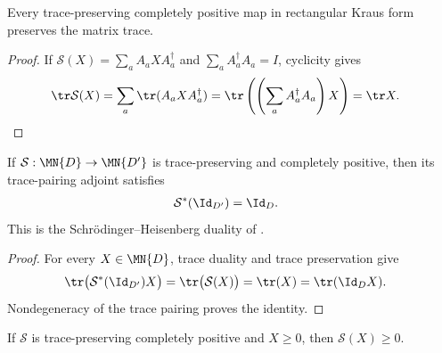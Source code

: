\begin{theorem}
    \label{thm:is_kraus_cptp_trace_map}
    \leanok
    Every trace-preserving completely positive map in rectangular Kraus form
    preserves the matrix trace.
\end{theorem}

\begin{proof}
    \leanok
    If $\mathcal S(X)=\sum_a A_aXA_a^\dagger$ and
    $\sum_a A_a^\dagger A_a=I$, cyclicity gives
    \begin{align}
        \tr\mathcal S(X)
        &=\sum_a\tr(A_aXA_a^\dagger)
          =\tr\left(\left(\sum_a A_a^\dagger A_a\right)X\right)
          =\tr X.
        \notag
    \end{align}
\end{proof}

\begin{theorem}
    \label{thm:is_kraus_cptp_trace_adjoint_one}
    \leanok
    If $\mathcal S:\MN{D}\to\MN{D'}$ is trace-preserving and completely
    positive, then its trace-pairing adjoint satisfies
    \begin{align}
        \mathcal S^*(\Id_{D'})
        &=\Id_D.
        \notag
    \end{align}
    This is the Schrödinger--Heisenberg duality of
    \cite[Section~1.2]{Wolf2012Quantum}.
\end{theorem}

\begin{proof}
    \leanok
    For every $X\in\MN{D}$, trace duality and trace preservation give
    \begin{align}
        \tr\bigl(\mathcal S^*(\Id_{D'})X\bigr)
        &=\tr\bigl(\mathcal S(X)\bigr)
        =\tr(X)
        =\tr(\Id_DX).
        \notag
    \end{align}
    Nondegeneracy of the trace pairing proves the identity.
\end{proof}

\begin{lemma}
    \label{lem:is_kraus_cptp_map_pos}
    \leanok
    If $\mathcal S$ is trace-preserving completely positive and $X\geq0$, then
    $\mathcal S(X)\geq0$.
\end{lemma}

